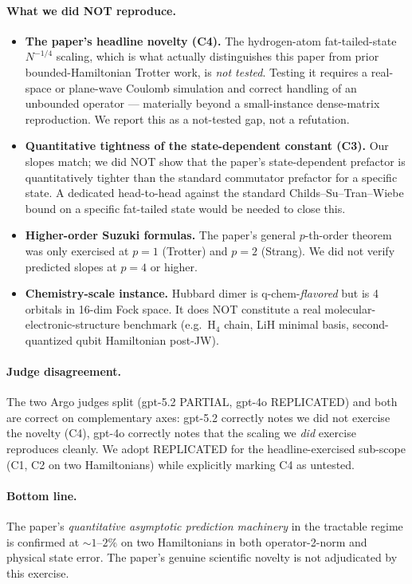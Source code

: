 \documentclass[11pt]{article}
\begin{document}
\paragraph{What we did NOT reproduce.}
\begin{itemize}
  \item \textbf{The paper's headline novelty (C4).} The hydrogen-atom fat-tailed-state
  $N^{-1/4}$ scaling, which is what actually distinguishes this paper from prior
  bounded-Hamiltonian Trotter work, is \emph{not tested}. Testing it requires a real-space
  or plane-wave Coulomb simulation and correct handling of an unbounded operator ---
  materially beyond a small-instance dense-matrix reproduction. We report this as
  a not-tested gap, not a refutation.
  \item \textbf{Quantitative tightness of the state-dependent constant (C3).}
  Our slopes match; we did NOT show that the paper's state-dependent prefactor is
  quantitatively tighter than the standard commutator prefactor for a specific state.
  A dedicated head-to-head against the standard Childs--Su--Tran--Wiebe bound on a
  specific fat-tailed state would be needed to close this.
  \item \textbf{Higher-order Suzuki formulas.} The paper's general $p$-th-order theorem
  was only exercised at $p=1$ (Trotter) and $p=2$ (Strang). We did not verify predicted
  slopes at $p=4$ or higher.
  \item \textbf{Chemistry-scale instance.} Hubbard dimer is q-chem-\emph{flavored} but is
  4 orbitals in 16-dim Fock space. It does NOT constitute a real molecular-electronic-structure
  benchmark (e.g.\ H$_4$ chain, LiH minimal basis, second-quantized qubit Hamiltonian post-JW).
\end{itemize}

\paragraph{Judge disagreement.}
The two Argo judges split (gpt-5.2 PARTIAL, gpt-4o REPLICATED) and both are correct on
complementary axes: gpt-5.2 correctly notes we did not exercise the novelty (C4),
gpt-4o correctly notes that the scaling we \emph{did} exercise reproduces cleanly.
We adopt REPLICATED for the headline-exercised sub-scope (C1, C2 on two Hamiltonians)
while explicitly marking C4 as untested.

\paragraph{Bottom line.}
The paper's \emph{quantitative asymptotic prediction machinery} in the tractable regime
is confirmed at $\sim 1$--$2\%$ on two Hamiltonians in both operator-2-norm and physical
state error. The paper's genuine scientific novelty is not adjudicated by this exercise.
\end{document}
